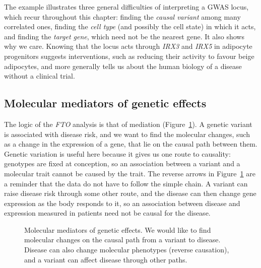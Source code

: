 The example illustrates three general difficulties of interpreting a GWAS locus, which recur throughout this chapter: finding the \emph{causal variant} among many correlated ones, finding the \emph{cell type} (and possibly the cell state) in which it acts, and finding the \emph{target gene}, which need not be the nearest gene. It also shows why we care. Knowing that the locus acts through \textit{IRX3} and \textit{IRX5} in adipocyte progenitors suggests interventions, such as reducing their activity to favour beige adipocytes, and more generally tells us about the human biology of a disease without a clinical trial.

\subsection{Molecular mediators of genetic effects}

The logic of the \textit{FTO} analysis is that of mediation (Figure~\ref{fig:mediation}). A genetic variant is associated with disease risk, and we want to find the molecular changes, such as a change in the expression of a gene, that lie on the causal path between them. Genetic variation is useful here because it gives us one route to causality: genotypes are fixed at conception, so an association between a variant and a molecular trait cannot be caused by the trait. The reverse arrows in Figure~\ref{fig:mediation} are a reminder that the data do not have to follow the simple chain. A variant can raise disease risk through some other route, and the disease can then change gene expression as the body responds to it, so an association between disease and expression measured in patients need not be causal for the disease.

\begin{figure}[!htbp]
  \centering
  \caption{Molecular mediators of genetic effects. We would like to find molecular changes on the causal path from a variant to disease. Disease can also change molecular phenotypes (reverse causation), and a variant can affect disease through other paths.}
  \label{fig:mediation}
\end{figure}

